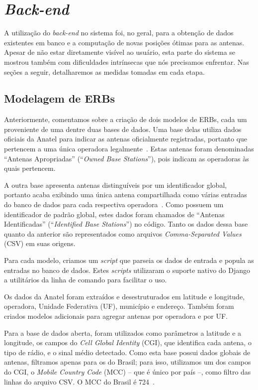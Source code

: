 \documentclass[]{politex}
\begin{document}
\section{\textit{Back-end}}

A utilização do \textit{back-end} no sistema foi, no geral, para a obtenção de
dados existentes em banco e a computação de novas posições ótimas para as antenas.
Apesar de não estar diretamente visível ao usuário, esta parte do sistema se
mostrou também com dificuldades intrínsecas que nós precisamos enfrentar. Nas
seções a seguir, detalharemos as medidas tomadas em cada etapa.

\subsection{Modelagem de ERBs}

Anteriormente, comentamos sobre a criação de dois modelos de ERBs, cada um
proveniente de uma dentre duas bases de dados. Uma base delas utiliza
dados oficiais da Anatel para indicar as antenas oficialmente registradas,
portanto que pertencem a uma única operadora legalmente~\cite{mapa-erb}.
Estas antenas foram denominadas ``Antenas Apropriadas'' (``\textit{Owned Base
Stations}''), pois indicam as operadoras às quais pertencem.

A outra base apresenta antenas distinguíveis por um identificador global,
portanto acaba exibindo uma única antena compartilhada como várias entradas do
banco de dados para cada respectiva operadora~\cite{opencellid}. Como possuem um
identificador de padrão global, estes dados foram chamados de ``Antenas
Identificadas'' (``\textit{Identified Base Stations}'') no código. Tanto os
dados dessa base quanto da anterior são representados como arquivos
\textit{Comma-Separated Values} (CSV) em suas origens.

Para cada modelo, criamos um \textit{script} que parseia os dados de entrada e
popula as entradas no banco de dados. Estes \textit{scripts} utilizaram o
suporte nativo do Django a utilitários da linha de comando para facilitar o
uso.

Os dados da Anatel foram extraídos e desestruturados em latitude e longitude,
operadora, Unidade Federativa (UF), município e endereço. Também foram criados
modelos adicionais para agregar antenas por operadora e por UF.

Para a base de dados aberta, foram utilizados como parâmetros a latitude e a
longitude, os campos do \textit{Cell Global Identity} (CGI), que identifica cada
antena, o tipo de rádio, e o sinal médio detectado. Como esta base possui dados
globais de antenas, filtramos apenas para os do Brasil; para isso, utilizamos
um dos campos do CGI, o \textit{Mobile Country Code} (MCC) -- que é único por
país --, como filtro das linhas do arquivo CSV. O MCC do Brasil é 724~\cite{mcc-mnc}.
\end{document}
